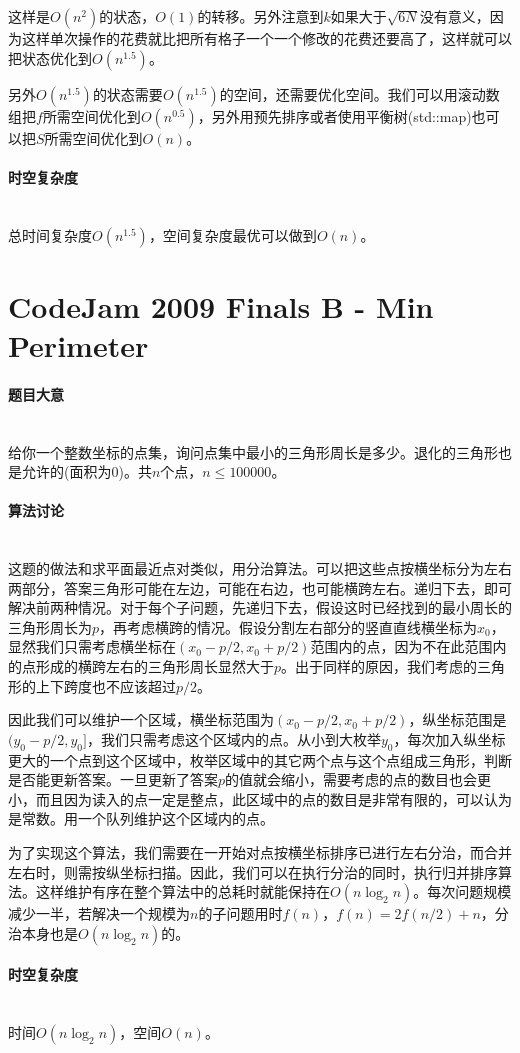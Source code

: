 \documentclass[UTF8]{ctexart}
\newcommand{\myparagraph}[1]{\paragraph{#1}\mbox{}\\}
\theoremstyle{nonumberplain}
\begin{document}
			这样是$O(n^2)$的状态，$O(1)$的转移。另外注意到$k$如果大于$\sqrt{6N}$没有意义，因为这样单次操作的花费就比把所有格子一个一个修改的花费还要高了，这样就可以把状态优化到$O(n^{1.5})$。
			
			另外$O(n^{1.5})$的状态需要$O(n^{1.5})$的空间，还需要优化空间。我们可以用滚动数组把$f$所需空间优化到$O(n^{0.5})$，另外用预先排序或者使用平衡树(std::map)也可以把$S$所需空间优化到$O(n)$。
		
		\myparagraph{时空复杂度}
		
			总时间复杂度$O(n^{1.5})$，空间复杂度最优可以做到$O(n)$。
	
	\section{CodeJam 2009 Finals B - Min Perimeter}
	
		\myparagraph{题目大意}
		
			给你一个整数坐标的点集，询问点集中最小的三角形周长是多少。退化的三角形也是允许的(面积为0)。共$n$个点，$n \leq 100000$。
			
		\myparagraph{算法讨论}
		
			这题的做法和求平面最近点对类似，用分治算法。可以把这些点按横坐标分为左右两部分，答案三角形可能在左边，可能在右边，也可能横跨左右。递归下去，即可解决前两种情况。对于每个子问题，先递归下去，假设这时已经找到的最小周长的三角形周长为$p$，再考虑横跨的情况。假设分割左右部分的竖直直线横坐标为$x_0$，显然我们只需考虑横坐标在$(x_0-p/2,x_0+p/2)$范围内的点，因为不在此范围内的点形成的横跨左右的三角形周长显然大于$p$。出于同样的原因，我们考虑的三角形的上下跨度也不应该超过$p/2$。
			
			因此我们可以维护一个区域，横坐标范围为$(x_0-p/2,x_0+p/2)$，纵坐标范围是$(y_0-p/2,y_0]$，我们只需考虑这个区域内的点。从小到大枚举$y_0$，每次加入纵坐标更大的一个点到这个区域中，枚举区域中的其它两个点与这个点组成三角形，判断是否能更新答案。一旦更新了答案$p$的值就会缩小，需要考虑的点的数目也会更小，而且因为读入的点一定是整点，此区域中的点的数目是非常有限的，可以认为是常数。用一个队列维护这个区域内的点。
			
			为了实现这个算法，我们需要在一开始对点按横坐标排序已进行左右分治，而合并左右时，则需按纵坐标扫描。因此，我们可以在执行分治的同时，执行归并排序算法。这样维护有序在整个算法中的总耗时就能保持在$O(n\log_2n)$。每次问题规模减少一半，若解决一个规模为$n$的子问题用时$f(n)$，$f(n)=2f(n/2)+n$，分治本身也是$O(n\log_2n)$的。
			
		\myparagraph{时空复杂度}
		
			时间$O(n\log_2n)$，空间$O(n)$。
	
\end{document}
